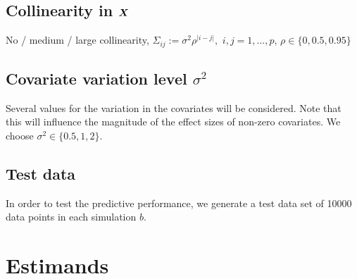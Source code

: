 \documentclass[a4paper, 11pt]{article}\usepackage[]{graphicx}\usepackage[]{color}
\begin{document}
\subsection*{Collinearity in $\text{\boldmath$X$}$}
 No / medium / large collinearity,
  $\Sigma_{ij} := \sigma^2 \rho^{\lvert i - j \rvert},$
  $i,j = 1, \dots, p$, $\rho \in \{0, 0.5, 0.95\}$

\subsection*{Covariate variation level $\sigma^{2}$}
Several values for the variation in the covariates will be considered. Note that
this will influence the magnitude of the effect sizes of non-zero covariates.
We choose $\sigma^{2} \in \{0.5, 1, 2\}$.

\subsection*{Test data}
In order to test the predictive performance, we generate a test data set of
10000 data points in each simulation $b$.

\section{Estimands} \label{sec:estimands}
\end{document}
